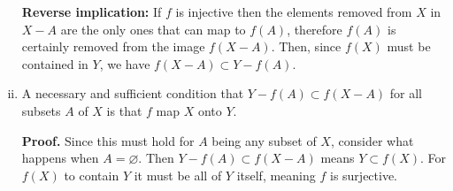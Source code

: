 \documentclass{article}
\begin{document}
\begin{enumerate}[(i)]
    \textbf{Reverse implication:} If $f$ is injective then the elements removed from $X$ in $X - A$ are the only ones that can map to $f(A)$, therefore $f(A)$ is certainly removed from the image $f(X - A)$. Then, since $f(X)$ must be contained in $Y$, we have $f(X - A) \subset Y - f(A)$.

    \item A necessary and sufficient condition that $Y - f(A) \subset f(X - A)$ for all subsets $A$ of $X$ is that $f$ map $X$ onto $Y$.
    
    \textbf{Proof.} Since this must hold for $A$ being any subset of $X$, consider what happens when $A = \varnothing$. Then $Y - f(A) \subset f(X - A)$ means $Y \subset f(X)$. For $f(X)$ to contain $Y$ it must be all of $Y$ itself, meaning $f$ is surjective.


\end{enumerate}
\end{document}
